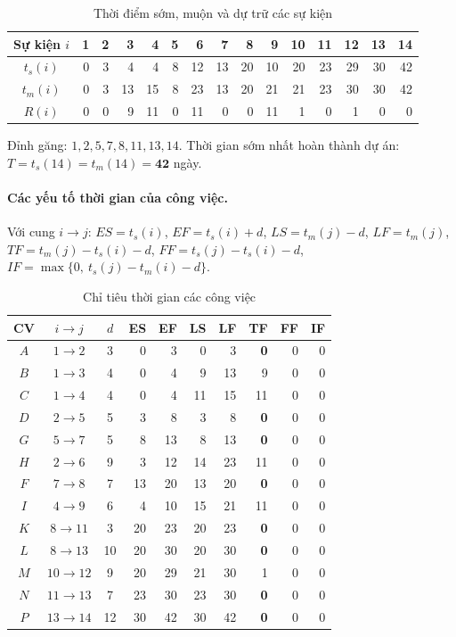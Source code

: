 \documentclass[12pt,a4paper]{article}
\begin{document}
\begin{table}[H]\centering
\caption{Thời điểm sớm, muộn và dự trữ các sự kiện}
\scriptsize
\begin{tabular}{c|rrrrrrrrrrrrrr}
\toprule
Sự kiện $i$ & 1 & 2 & 3 & 4 & 5 & 6 & 7 & 8 & 9 & 10 & 11 & 12 & 13 & 14\\
\midrule
$t_s(i)$ & 0 & 3 & 4 & 4 & 8 & 12 & 13 & 20 & 10 & 20 & 23 & 29 & 30 & 42\\
$t_m(i)$ & 0 & 3 & 13 & 15 & 8 & 23 & 13 & 20 & 21 & 21 & 23 & 30 & 30 & 42\\
$R(i)$   & 0 & 0 & 9 & 11 & 0 & 11 & 0 & 0 & 11 & 1 & 0 & 1 & 0 & 0\\
\bottomrule
\end{tabular}
\end{table}

Đỉnh găng: $1,2,5,7,8,11,13,14$.
Thời gian sớm nhất hoàn thành dự án: $T=t_s(14)=t_m(14)=\mathbf{42}$ ngày.

\paragraph{Các yếu tố thời gian của công việc.}
Với cung $i\rightarrow j$:
$ES=t_s(i)$, $EF=t_s(i)+d$, $LS=t_m(j)-d$, $LF=t_m(j)$,
$TF=t_m(j)-t_s(i)-d$,
$FF=t_s(j)-t_s(i)-d$,
$IF=\max\{0,\ t_s(j)-t_m(i)-d\}$.

\begin{table}[H]\centering
\caption{Chỉ tiêu thời gian các công việc}
\small
\begin{tabular}{c|c|c|rr|rr|rrr}
\toprule
\textbf{CV} & $i\!\rightarrow\!j$ & $d$ & ES & EF & LS & LF & TF & FF & IF\\
\midrule
$A$ & $1\rightarrow 2$ & 3 & 0 & 3 & 0 & 3 & \textbf{0} & 0 & 0\\
$B$ & $1\rightarrow 3$ & 4 & 0 & 4 & 9 & 13 & 9 & 0 & 0\\
$C$ & $1\rightarrow 4$ & 4 & 0 & 4 & 11 & 15 & 11 & 0 & 0\\
$D$ & $2\rightarrow 5$ & 5 & 3 & 8 & 3 & 8 & \textbf{0} & 0 & 0\\
$G$ & $5\rightarrow 7$ & 5 & 8 & 13 & 8 & 13 & \textbf{0} & 0 & 0\\
$H$ & $2\rightarrow 6$ & 9 & 3 & 12 & 14 & 23 & 11 & 0 & 0\\
$F$ & $7\rightarrow 8$ & 7 & 13 & 20 & 13 & 20 & \textbf{0} & 0 & 0\\
$I$ & $4\rightarrow 9$ & 6 & 4 & 10 & 15 & 21 & 11 & 0 & 0\\
$K$ & $8\rightarrow 11$ & 3 & 20 & 23 & 20 & 23 & \textbf{0} & 0 & 0\\
$L$ & $8\rightarrow 13$ & 10 & 20 & 30 & 20 & 30 & \textbf{0} & 0 & 0\\
$M$ & $10\rightarrow 12$ & 9 & 20 & 29 & 21 & 30 & 1 & 0 & 0\\
$N$ & $11\rightarrow 13$ & 7 & 23 & 30 & 23 & 30 & \textbf{0} & 0 & 0\\
$P$ & $13\rightarrow 14$ & 12 & 30 & 42 & 30 & 42 & \textbf{0} & 0 & 0\\
\bottomrule
\end{tabular}
\end{table}
\end{document}
